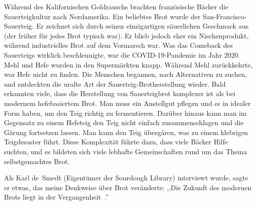 Während des Kalifornischen Goldrauschs brachten französische Bäcker die Sauerteigkultur
nach Nordamerika. Ein beliebtes Brot wurde der
San-Francisco-Sauerteig. Er zeichnet sich durch seinen einzigartigen
säuerlichen Geschmack aus (der früher für jedes Brot typisch war). Er
blieb jedoch eher ein Nischenprodukt, während industrielles Brot
auf dem Vormarsch war. Was das Comeback des Sauerteigs wirklich beschleunigte,
war die COVID-19-Pandemie im Jahr \num{2020}.
Mehl und Hefe wurden in den Supermärkten knapp. Während
Mehl zurückkehrte, war Hefe nicht zu finden. Die Menschen begannen,
nach Alternativen zu suchen, und entdeckten die uralte
Art der Sauerteig-Brotherstellung wieder. Bald erkannten viele,
dass die Herstellung von Sauerteigbrot komplexer ist als bei modernem
hefebasiertem Brot. Man muss ein Anstellgut pflegen
und es in idealer Form haben, um den Teig richtig zu fermentieren.
Darüber hinaus kann man im Gegensatz zu einem Hefeteig den Teig nicht einfach
zusammenschlagen und die Gärung fortsetzen lassen.
Man kann den Teig übergären, was zu einem klebrigen
Teigdesaster führt. Diese Komplexität führte dazu, dass viele Bäcker
Hilfe suchten, und es bildeten sich viele lebhafte Gemeinschaften rund um
das Thema selbstgemachtes Brot.

Als Karl de~Smedt (Eigentümer der Sourdough
Library) interviewt wurde, sagte er etwas, das meine Denkweise
über Brot veränderte: ,,Die Zukunft des
modernen Brots liegt in der Vergangenheit~\cite{interview+karl+de+smedt}.''
